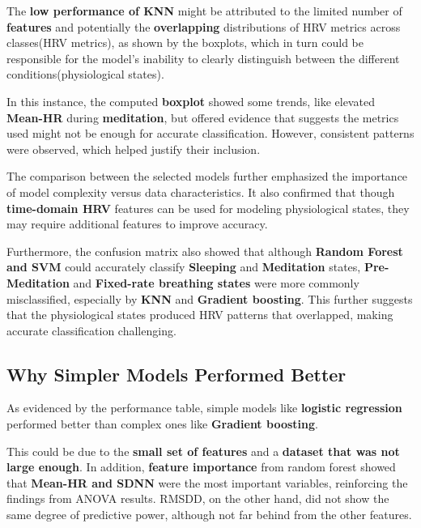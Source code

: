 \documentclass[
  11pt,
]{ieee}
\begin{document}
The \textbf{low performance of KNN} might be attributed to the limited
number of \textbf{features} and potentially the \textbf{overlapping}
distributions of HRV metrics across classes(HRV metrics), as shown by
the boxplots, which in turn could be responsible for the model's
inability to clearly distinguish between the different
conditions(physiological states).

In this instance, the computed \textbf{boxplot} showed some trends, like
elevated \textbf{Mean-HR} during \textbf{meditation}, but offered
evidence that suggests the metrics used might not be enough for accurate
classification. However, consistent patterns were observed, which helped
justify their inclusion.

The comparison between the selected models further emphasized the
importance of model complexity versus data characteristics. It also
confirmed that though \textbf{time-domain HRV} features can be used for
modeling physiological states, they may require additional features to
improve accuracy.

Furthermore, the confusion matrix also showed that although
\textbf{Random Forest and SVM} could accurately classify
\textbf{Sleeping} and \textbf{Meditation} states,
\textbf{Pre-Meditation} and \textbf{Fixed-rate breathing states} were
more commonly misclassified, especially by \textbf{KNN} and
\textbf{Gradient boosting}. This further suggests that the physiological
states produced HRV patterns that overlapped, making accurate
classification challenging.

\subsection{Why Simpler Models Performed
Better}\label{why-simpler-models-performed-better}

\vspace{0.8em}

As evidenced by the performance table, simple models like
\textbf{logistic regression} performed better than complex ones like
\textbf{Gradient boosting}.

This could be due to the \textbf{small set of features} and a
\textbf{dataset that was not large enough}. In addition, \textbf{feature
importance} from random forest showed that \textbf{Mean-HR and SDNN}
were the most important variables, reinforcing the findings from ANOVA
results. RMSDD, on the other hand, did not show the same degree of
predictive power, although not far behind from the other features.
\end{document}
